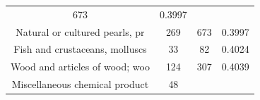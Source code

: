 \documentclass[10pt,]{article}
\begin{document}
\begin{longtable}[]{@{}cccc@{}}
\begin{minipage}[t]{0.20\columnwidth}
673\strut
\end{minipage} & \begin{minipage}[t]{0.09\columnwidth}\centering\strut
0.3997\strut
\end{minipage}\tabularnewline
\begin{minipage}[t]{0.38\columnwidth}\centering\strut
Natural or cultured pearls, pr\strut
\end{minipage} & \begin{minipage}[t]{0.21\columnwidth}\centering\strut
269\strut
\end{minipage} & \begin{minipage}[t]{0.20\columnwidth}\centering\strut
673\strut
\end{minipage} & \begin{minipage}[t]{0.09\columnwidth}\centering\strut
0.3997\strut
\end{minipage}\tabularnewline
\begin{minipage}[t]{0.38\columnwidth}\centering\strut
Fish and crustaceans, molluscs\strut
\end{minipage} & \begin{minipage}[t]{0.21\columnwidth}\centering\strut
33\strut
\end{minipage} & \begin{minipage}[t]{0.20\columnwidth}\centering\strut
82\strut
\end{minipage} & \begin{minipage}[t]{0.09\columnwidth}\centering\strut
0.4024\strut
\end{minipage}\tabularnewline
\begin{minipage}[t]{0.38\columnwidth}\centering\strut
Wood and articles of wood; woo\strut
\end{minipage} & \begin{minipage}[t]{0.21\columnwidth}\centering\strut
124\strut
\end{minipage} & \begin{minipage}[t]{0.20\columnwidth}\centering\strut
307\strut
\end{minipage} & \begin{minipage}[t]{0.09\columnwidth}\centering\strut
0.4039\strut
\end{minipage}\tabularnewline
\begin{minipage}[t]{0.38\columnwidth}\centering\strut
Miscellaneous chemical product\strut
\end{minipage} & \begin{minipage}[t]{0.21\columnwidth}\centering\strut
48\strut
\end{minipage} & \begin{minipage}[t]{0.20\columnwidth}\centering\strut

\end{minipage}
\end{longtable}
\end{document}
